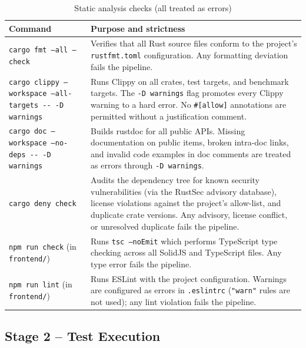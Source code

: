 \documentclass[a4paper, 11pt, oneside]{report}
\begin{document}
\begin{table}[H]
  \centering
  \caption{Static analysis checks (all treated as errors)}
  \label{tab:ci-static}
  \begin{tabularx}{\textwidth}{l X}
    \toprule
    \textbf{Command} & \textbf{Purpose and strictness} \\
    \midrule
    \texttt{cargo fmt --all --check} &
      Verifies that all Rust source files conform to the project's
      \texttt{rustfmt.toml} configuration.  Any formatting deviation
      fails the pipeline. \\
    \texttt{cargo clippy --workspace --all-targets \mbox{-{}-} -D warnings} &
      Runs Clippy on all crates, test targets, and benchmark targets.
      The \texttt{-D warnings} flag promotes every Clippy warning to a
      hard error.  No \texttt{\#[allow]} annotations are permitted
      without a justification comment. \\
    \texttt{cargo doc --workspace --no-deps \mbox{-{}-} -D warnings} &
      Builds rustdoc for all public APIs.  Missing documentation on
      public items, broken intra-doc links, and invalid code examples
      in doc comments are treated as errors through \texttt{-D warnings}. \\
    \texttt{cargo deny check} &
      Audits the dependency tree for known security vulnerabilities
      (via the RustSec advisory database), license violations
      against the project's allow-list, and duplicate crate versions.
      Any advisory, license conflict, or unresolved duplicate fails
      the pipeline. \\
    \texttt{npm run check} (in \texttt{frontend/}) &
      Runs \texttt{tsc --noEmit} which performs TypeScript type
      checking across all SolidJS and TypeScript files.  Any type
      error fails the pipeline. \\
    \texttt{npm run lint} (in \texttt{frontend/}) &
      Runs ESLint with the project configuration.  Warnings are
      configured as errors in \texttt{.eslintrc} (\texttt{"warn"}
      rules are not used); any lint violation fails the pipeline. \\
    \bottomrule
  \end{tabularx}
\end{table}

\subsection{Stage 2 -- Test Execution}
\label{sec:ci-tests}
\end{document}
